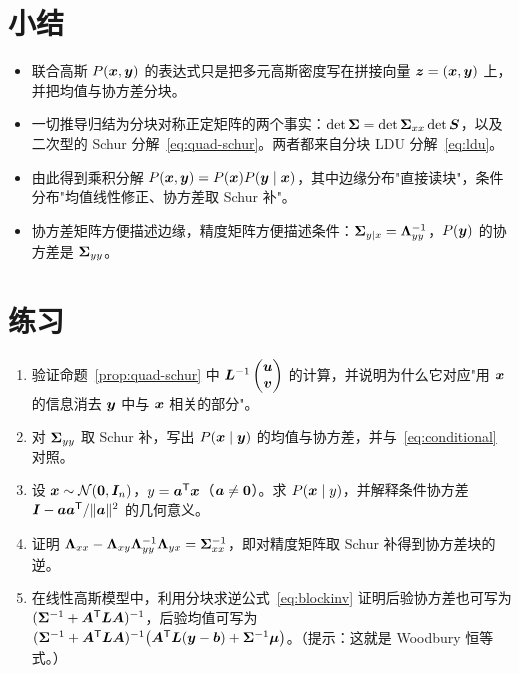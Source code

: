 \section{小结}

\begin{itemize}[nosep]
  \item 联合高斯 $P(\bm{x},\bm{y})$ 的表达式只是把多元高斯密度写在拼接向量 $\bm{z}=(\bm{x},\bm{y})$ 上，并把均值与协方差分块。
  \item 一切推导归结为分块对称正定矩阵的两个事实：$\det\bm{\Sigma}=\det\bm{\Sigma}_{xx}\det\bm{S}$，以及二次型的 Schur 分解~\eqref{eq:quad-schur}。两者都来自分块 LDU 分解~\eqref{eq:ldu}。
  \item 由此得到乘积分解 $P(\bm{x},\bm{y})=P(\bm{x})P(\bm{y}\mid\bm{x})$，其中边缘分布"直接读块"，条件分布"均值线性修正、协方差取 Schur 补"。
  \item 协方差矩阵方便描述边缘，精度矩阵方便描述条件：$\bm{\Sigma}_{y|x}=\bm{\Lambda}_{yy}^{-1}$，$P(\bm{y})$ 的协方差是 $\bm{\Sigma}_{yy}$。
\end{itemize}

\section*{练习}

\begin{enumerate}[nosep]
  \item 验证命题~\ref{prop:quad-schur} 中 $\bm{L}^{-1}\begin{pmatrix}\bm{u}\\ \bm{v}\end{pmatrix}$ 的计算，并说明为什么它对应"用 $\bm{x}$ 的信息消去 $\bm{y}$ 中与 $\bm{x}$ 相关的部分"。
  \item 对 $\bm{\Sigma}_{yy}$ 取 Schur 补，写出 $P(\bm{x}\mid\bm{y})$ 的均值与协方差，并与~\eqref{eq:conditional} 对照。
  \item 设 $\bm{x}\sim\mathcal{N}(\bm{0},\bm{I}_n)$，$y=\bm{a}^{\mathsf{T}}\bm{x}$（$\bm{a}\ne\bm{0}$）。求 $P(\bm{x}\mid y)$，并解释条件协方差 $\bm{I}-\bm{a}\bm{a}^{\mathsf{T}}/\|\bm{a}\|^2$ 的几何意义。
  \item 证明 $\bm{\Lambda}_{xx}-\bm{\Lambda}_{xy}\bm{\Lambda}_{yy}^{-1}\bm{\Lambda}_{yx}=\bm{\Sigma}_{xx}^{-1}$，即对精度矩阵取 Schur 补得到协方差块的逆。
  \item 在线性高斯模型中，利用分块求逆公式~\eqref{eq:blockinv} 证明后验协方差也可写为 $(\bm{\Sigma}^{-1}+\bm{A}^{\mathsf{T}}\bm{L}\bm{A})^{-1}$，后验均值可写为 $(\bm{\Sigma}^{-1}+\bm{A}^{\mathsf{T}}\bm{L}\bm{A})^{-1}\big(\bm{A}^{\mathsf{T}}\bm{L}(\bm{y}-\bm{b})+\bm{\Sigma}^{-1}\bm{\mu}\big)$。（提示：这就是 Woodbury 恒等式。）
\end{enumerate}

